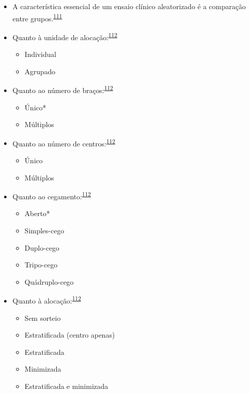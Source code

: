 \documentclass[
]{book}
\begin{document}
\begin{itemize}
\item
  A característica essencial de um ensaio clínico aleatorizado é a comparação entre grupos.\textsuperscript{\protect\hyperlink{ref-bland2011}{111}}
\item
  Quanto à unidade de alocação:\textsuperscript{\protect\hyperlink{ref-Bruce2022}{112}}

  \begin{itemize}
  \item
    Individual
  \item
    Agrupado
  \end{itemize}
\item
  Quanto ao número de braços:\textsuperscript{\protect\hyperlink{ref-Bruce2022}{112}}

  \begin{itemize}
  \item
    Único*
  \item
    Múltiplos
  \end{itemize}
\item
  Quanto ao número de centros:\textsuperscript{\protect\hyperlink{ref-Bruce2022}{112}}

  \begin{itemize}
  \item
    Único
  \item
    Múltiplos
  \end{itemize}
\item
  Quanto ao cegamento:\textsuperscript{\protect\hyperlink{ref-Bruce2022}{112}}

  \begin{itemize}
  \item
    Aberto*
  \item
    Simples-cego
  \item
    Duplo-cego
  \item
    Tripo-cego
  \item
    Quádruplo-cego
  \end{itemize}
\item
  Quanto à alocação:\textsuperscript{\protect\hyperlink{ref-Bruce2022}{112}}

  \begin{itemize}
  \item
    Sem sorteio
  \item
    Estratificada (centro apenas)
  \item
    Estratificada
  \item
    Minimizada
  \item
    Estratificada e minimizada
  \end{itemize}
\end{itemize}
\end{document}
